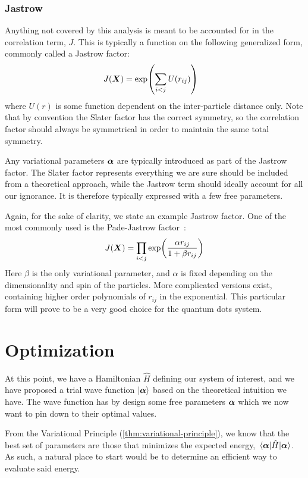 \documentclass[Thesis.tex]{subfiles}
\begin{document}
\subsubsection*{Jastrow}

Anything not covered by this analysis is meant to be accounted for in the correlation
term, $J$. This is typically a function on the following generalized form, commonly called a Jastrow
factor:
\begin{align}
    J(\bm{X}) &= \exp(\sum_{i < j} U(r_{ij}))
\end{align}
where $U(r)$ is some function dependent on the inter-particle distance only. Note that by
convention the Slater factor has the correct symmetry, so the correlation factor should
always be symmetrical in order to maintain the same total symmetry.

Any variational parameters $\bm{\alpha}$ are typically introduced as part of the Jastrow
factor. The Slater factor represents everything we are sure should be included
from a theoretical approach, while the Jastrow term should ideally account for all our ignorance.
It is therefore typically expressed with a few free parameters.

Again, for the sake of clarity, we state an example Jastrow factor. One of the most
commonly used is the Pade-Jastrow factor~\cite{Drummond-Towler-Needs-2008}:
\begin{align}
    J(\bm{X}) = \prod_{i < j} \exp(\frac{\alpha r_{ij}}{1 + \beta r_{ij} } )
\end{align}
Here $\beta$ is the only variational parameter, and $\alpha$ is fixed depending on the
dimensionality and spin of the particles. More complicated versions exist, containing
higher order polynomials of $r_{ij}$ in the exponential. This particular form
will prove to be a very good choice for the quantum dots system.




\section{Optimization}

At this point, we have a Hamiltonian $\hat H$ defining our system of interest,
and we have proposed a trial wave function $| \bm{\alpha} \rangle$ based on the
theoretical intuition we have. The wave function has by design some free
parameters $\bm{\alpha}$ which we now want to pin down to their optimal values.

From the Variational Principle (\autoref{thm:variational-principle}), we know
that the best set of parameters are those that minimizes the expected energy,
$\expval{\hat H}{\bm{\alpha}}$. As such, a natural place to start would be to
determine an efficient way to evaluate said energy.
\end{document}
